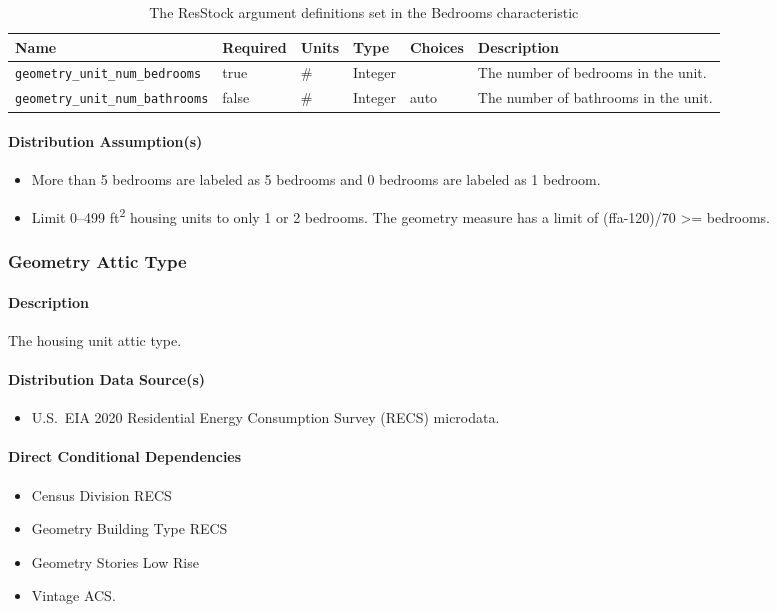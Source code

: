\begin{longtable}[]{ |p{}|p{1.5cm}|p{1cm}|p{1.1cm}|p{1.4cm}|p{6cm}| }
\caption{The ResStock argument definitions set in the Bedrooms characteristic} \label{table:hc_arg_def_bed} \\
\toprule\noalign{}
Name & Required & Units & Type & Choices & Description \\
\midrule\noalign{}
\endhead
\bottomrule\noalign{}
\endlastfoot
\texttt{geometry\_unit\_num\_bedrooms} & true & \# & Integer & & The
number of bedrooms in the unit. \\
\hline
\texttt{geometry\_unit\_num\_bathrooms} & false & \# & Integer & auto &
The number of bathrooms in the unit.  \\
\end{longtable}

\paragraph{Distribution Assumption(s)}
\begin{itemize}
    \item More than 5 bedrooms are labeled as 5 bedrooms and 0 bedrooms are labeled as 1 bedroom.
    \item Limit 0--499 ft\textsuperscript{2} housing units to only 1 or 2 bedrooms. The geometry measure has a limit of (ffa-120)/70 >= bedrooms.
\end{itemize}

\subsubsection{Geometry Attic Type}
\paragraph{Description}
The housing unit attic type.

\paragraph{Distribution Data Source(s)}
\begin{itemize}
    \item U.S.~EIA 2020 Residential Energy Consumption Survey (RECS) microdata.
\end{itemize}

\paragraph{Direct Conditional Dependencies}
\begin{itemize}
    \item Census Division RECS
    \item Geometry Building Type RECS
    \item Geometry Stories Low Rise
    \item Vintage ACS.
\end{itemize}

